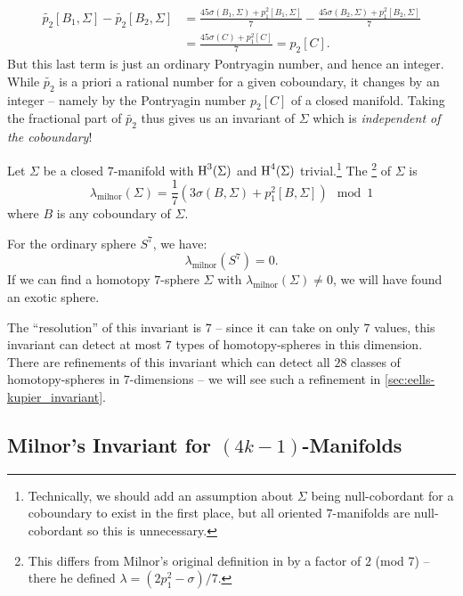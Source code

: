 \[
	\begin{aligned}
		\widetilde{p_2}[B_1,\Sigma] - \widetilde{p_2}[B_2,\Sigma]
		 & = \frac{45\sigma(B_1,\Sigma) + p_1^2[B_1,\Sigma]}{7} - \frac{45\sigma(B_2, \Sigma) + p_1^2[B_2,\Sigma]}{7} \\
		 & =\frac{45\sigma(C) + p_1^2[C]}{7} = p_2[C].
	\end{aligned}
\]
But this last term is just an ordinary Pontryagin number, and hence an integer. While $\widetilde{p_2}$ is a priori a rational number for a given coboundary, it changes by an integer -- namely by the Pontryagin number $p_2[C]$ of a closed manifold.
Taking the fractional part of $\widetilde{p_2}$ thus gives us an invariant of $\Sigma$ which is \emph{independent of the coboundary}! 

\begin{definition}
	Let $\Sigma$ be a closed $7$-manifold with $\operatorname{H}^3(\Sigma)$ and $\operatorname{H}^4(\Sigma)$ trivial.\footnote{Technically, we should add an assumption about $\Sigma$ being null-cobordant for a coboundary to exist in the first place, but all oriented $7$-manifolds are null-cobordant so this is unnecessary.} The \footnote{This differs from Milnor's original definition in \cite{milnor1956manifolds} by a factor of $2$ (mod 7) -- there he defined $\lambda=(2p_1^2-\sigma)/7$.} of $\Sigma$ is
	\[
		\boxed{\lambda_{\mathrm{milnor}}(\Sigma) = \frac{1}{7}\left(3\sigma(B,\Sigma)+p_1^2[B,\Sigma]\right)\mod 1}
	\]
	where $B$ is any coboundary of $\Sigma$.
\end{definition}
For the ordinary sphere $S^7$, we have:
\[
	\lambda_{\textrm{milnor}}(S^7)=0.
\]
If we can find a homotopy $7$-sphere $\Sigma$ with $\lambda_{\textrm{milnor}}(\Sigma)\neq 0$, we will have found an exotic sphere.

\begin{remark} The ``resolution'' of this invariant is $7$ -- since it can take on only $7$ values, this invariant can detect at most $7$ types of homotopy-spheres in this dimension. There are refinements of this invariant which can detect all $28$ classes of homotopy-spheres in $7$-dimensions -- we will see such a refinement in \cref{sec:eells-kupier_invariant}.\end{remark}

\subsection*{Milnor's Invariant for $(4k-1)$-Manifolds}

